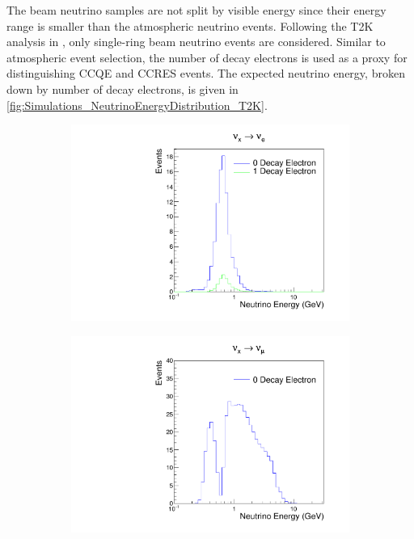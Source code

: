 The beam neutrino samples are not split by visible energy since their energy range is smaller than the atmospheric neutrino events. Following the T2K analysis in \cite{Dunne2020-uf}, only single-ring beam neutrino events are considered. Similar to atmospheric event selection, the number of decay electrons is used as a proxy for distinguishing CCQE and CCRES events. The expected neutrino energy, broken down by number of decay electrons, is given in \autoref{fig:Simulations_NeutrinoEnergyDistribution_T2K}.

\begin{figure}[h]
  \begin{subfigure}[t]{0.49\textwidth}
    \includegraphics[width=\textwidth, trim={0mm 0mm 0mm 0mm}, clip,page=1]{Figures/Simulations/NeutrinoEnergyDist_T2K_NuE.pdf}
  \end{subfigure}%
  \begin{subfigure}[t]{0.49\textwidth}
    \includegraphics[width=\textwidth, trim={0mm 0mm 0mm 0mm}, clip,page=1]{Figures/Simulations/NeutrinoEnergyDist_T2K_NuMu.pdf}

\end{subfigure}
\end{figure}
